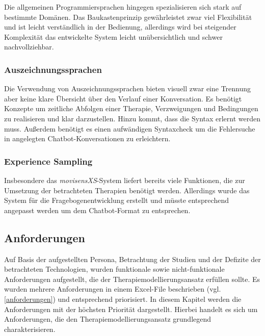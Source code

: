Die allgemeinen Programmiersprachen hingegen spezialisieren sich stark auf bestimmte Domänen. Das Baukastenprinzip gewährleistet zwar viel Flexibilität und ist leicht verständlich in der Bedienung, allerdings wird bei steigender Komplexität das entwickelte System leicht unübersichtlich und schwer nachvollziehbar.

\subsubsection{Auszeichnungssprachen}
Die Verwendung von Auszeichnungssprachen bieten visuell zwar eine Trennung aber keine klare Übersicht über den Verlauf einer Konversation. Es benötigt Konzepte um zeitliche Abfolgen einer Therapie, Verzweigungen und Bedingungen zu realisieren und klar darzustellen. Hinzu kommt, dass die Syntax erlernt werden muss. Außerdem benötigt es einen aufwändigen Syntaxcheck um die Fehlersuche in angelegten Chatbot-Konversationen zu erleichtern.   

\subsubsection{Experience Sampling}
Insbesondere das \emph{movisensXS}-System liefert bereits viele Funktionen, die zur Umsetzung der betrachteten Therapien benötigt werden. Allerdings wurde das System für die Fragebogenentwicklung erstellt und müsste entsprechend angepasst werden um dem Chatbot-Format zu entsprechen.  


\subsection{Anforderungen}
Auf Basis der aufgestellten Persona, Betrachtung der Studien und der Defizite der betrachteten Technologien, wurden funktionale sowie nicht-funktionale Anforderungen aufgestellt, die der Therapiemodellierungsansatz erfüllen sollte. Es wurden mehrere Anforderungen in einem Excel-File beschrieben (vgl. \ref{anforderungen}) und entsprechend priorisiert. In diesem Kapitel werden die Anforderungen mit der höchsten Priorität dargestellt. Hierbei handelt es sich um Anforderungen, die den Therapiemodellierungsansatz grundlegend charakterisieren.

